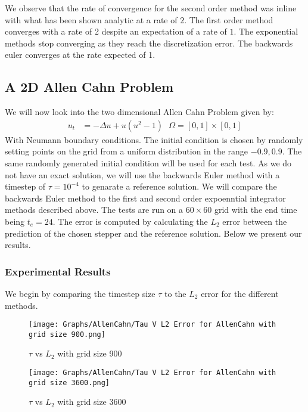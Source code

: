 We observe that the rate of convergence for the second order method was inline with what has been shown analytic\cite{Huang2022} at a rate of $2$.
The first order method converges with a rate of 2 despite an expectation of a rate of $1$\cite{Huang2022}.
The exponential methods stop converging as they reach the discretization error.
The backwards euler converges at the rate expected of 1.

\subsection{A 2D Allen Cahn Problem}

We will now look into the two dimensional Allen Cahn Problem given by:
\begin{align*}
    u_t &= -\Delta u + u (u^2-1) \text{ } \Omega=[0,1]\times[0,1]
\end{align*}
With Neumann boundary conditions.
The initial condition is chosen by randomly setting points on the grid from a uniform distribution in the range $-0.9,0.9$.
The same randomly generated initial condition will be used for each test.
As we do not have an exact solution, we will use the backwards Euler method with a timestep of $\tau = 10^{-4}$ to genarate a reference solution.
We will compare the backwards Euler method to the first and second order expoenntial integrator methods described above.
The tests are run on a $60\times60$ grid with the end time being $t_e=24$.
The error is computed by calculating the $L_2$ error between the prediction of the chosen stepper and the reference solution. 
Below we present our results.

\subsubsection{Experimental Results}

We begin by comparing the timestep size $\tau$ to the $L_2$ error for the different methods.

\begin{figure}[H]
    \centering
    \begin{minipage}{0.49\textwidth}
        \texttt{[image: Graphs/AllenCahn/Tau V L2 Error for AllenCahn with grid size 900.png]} %
        \caption{$\tau$ vs $L_2$ with grid size 900}
        \label{fig:ACtauE}
    \end{minipage}\hfill
    \centering
    \begin{minipage}{0.49\textwidth}
        \texttt{[image: Graphs/AllenCahn/Tau V L2 Error for AllenCahn with grid size 3600.png]} %
        \caption{$\tau$ vs $L_2$ with grid size 3600}
        \label{fig:ACtauE1024}
    \end{minipage}\hfill
\end{figure}

